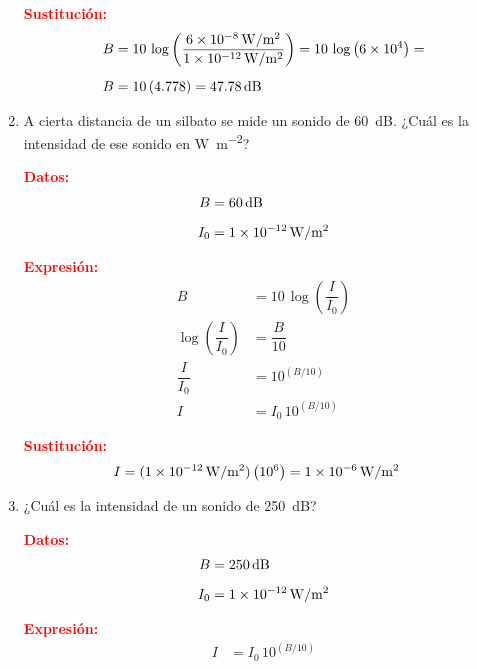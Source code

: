 \documentclass[14pt]{extarticle}
\newcommand{\textocolor}[2]{\textbf{\textcolor{#1}{#2}}}
\begin{document}
\begin{enumerate}
\textocolor{red}{Sustitución:}
\begin{align*}
B &= 10 \, \log \left( \dfrac{\SI{6d-8}{\watt\per\square\meter}}{\SI{1d-12}{\watt\per\square\meter}} \right) = 10 \, \log \left( \num{6d4} \right) = \\[0.5em]
B &= 10 \, (4.778) = \SI{47.78}{\dB}
\end{align*}
\item A cierta distancia de un silbato se mide un sonido de \SI{60}{\dB}. ¿Cuál es la intensidad de ese sonido en \unit{\watt\per\square\meter}?

\begin{minipage}[t]{0.4\linewidth}
\textocolor{red}{Datos:}
\begin{align*}
B &= \SI{60}{\dB} \\[0.5em]
I_{0} &= \SI{1d-12}{\watt\per\square\meter}
\end{align*}
\end{minipage}
\hspace{0.4cm}
\begin{minipage}[t]{0.4\linewidth}
\textocolor{red}{Expresión:}
\begin{align*}
B &= 10 \, \log \left( \dfrac{I}{I_{0}} \right) \\[0.5em]
\log \left( \dfrac{I}{I_{0}} \right) &= \dfrac{B}{10} \\[0.5em]
\dfrac{I}{I_{0}} &= 10^{(B/10)} \\[0.5em]
I &= I_{0} \, 10^{(B/10)}
\end{align*}
\end{minipage}

\textocolor{red}{Sustitución:}
\begin{align*}
I &= (\SI{1d-12}{\watt\per\square\meter}) \left( 10^{6} \right) = \SI{1d-6}{\watt\per\square\meter}
\end{align*}
\item ¿Cuál es la intensidad de un sonido de \SI{250}{\dB}?

\begin{minipage}[t]{0.4\linewidth}
\textocolor{red}{Datos:}
\begin{align*}
B &= \SI{250}{\dB} \\[0.5em]
I_{0} &= \SI{1d-12}{\watt\per\square\meter}
\end{align*}
\end{minipage}
\hspace{0.4cm}
\begin{minipage}[t]{0.4\linewidth}
\textocolor{red}{Expresión:}
\begin{align*}
I &= I_{0} \, 10^{(B/10)}
\end{align*}
\end{minipage}


\end{enumerate}
\end{document}
